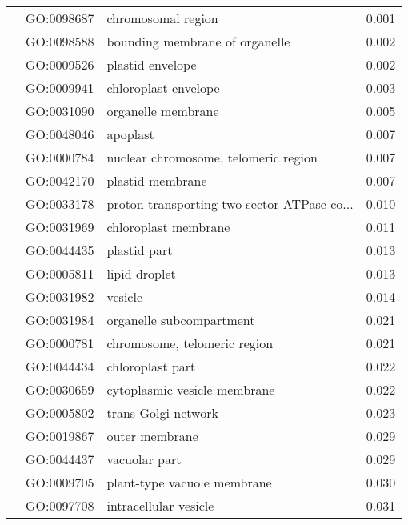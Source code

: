 \begin{longtable}{lllr}
   & GO:0098687 &                           chromosomal region &         0.001 \\
   & GO:0098588 &               bounding membrane of organelle &         0.002 \\
   & GO:0009526 &                             plastid envelope &         0.002 \\
   & GO:0009941 &                         chloroplast envelope &         0.003 \\
   & GO:0031090 &                           organelle membrane &         0.005 \\
   & GO:0048046 &                                     apoplast &         0.007 \\
   & GO:0000784 &         nuclear chromosome, telomeric region &         0.007 \\
   & GO:0042170 &                             plastid membrane &         0.007 \\
   & GO:0033178 &  proton-transporting two-sector ATPase co... &         0.010 \\
   & GO:0031969 &                         chloroplast membrane &         0.011 \\
   & GO:0044435 &                                 plastid part &         0.013 \\
   & GO:0005811 &                                lipid droplet &         0.013 \\
   & GO:0031982 &                                      vesicle &         0.014 \\
   & GO:0031984 &                     organelle subcompartment &         0.021 \\
   & GO:0000781 &                 chromosome, telomeric region &         0.021 \\
   & GO:0044434 &                             chloroplast part &         0.022 \\
   & GO:0030659 &                 cytoplasmic vesicle membrane &         0.022 \\
   & GO:0005802 &                          trans-Golgi network &         0.023 \\
   & GO:0019867 &                               outer membrane &         0.029 \\
   & GO:0044437 &                                vacuolar part &         0.029 \\
   & GO:0009705 &                  plant-type vacuole membrane &         0.030 \\
   & GO:0097708 &                        intracellular vesicle &         0.031 \\

\end{longtable}
